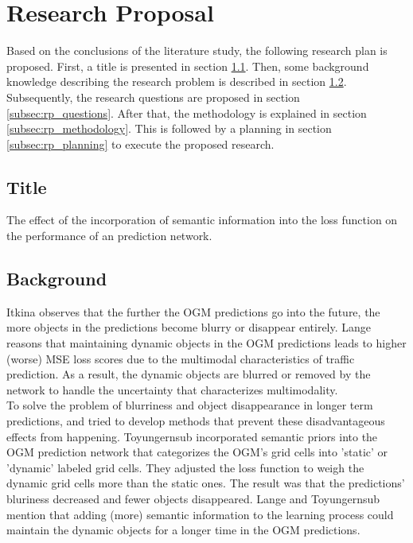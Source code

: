 \section{Research Proposal} \label{sec:res_prop}
Based on the conclusions of the literature study, the following research plan is proposed. First, a title is presented in section \ref{subsec:rp_title}. Then, some background knowledge describing the research problem is described in section \ref{subsec:rp_background}. Subsequently, the research questions are proposed in section \ref{subsec:rp_questions}. After that, the methodology is explained in section \ref{subsec:rp_methodology}. This is followed by a planning in section \ref{subsec:rp_planning} to execute the proposed research. 

\subsection{Title} \label{subsec:rp_title}
The effect of the incorporation of semantic information into the loss function on the performance of an  prediction network.

\subsection{Background} \label{subsec:rp_background}
Itkina \cite{itkina2019dynamic} observes that the further the \gls{OGM} predictions go into the future, the more objects in the predictions become blurry or disappear entirely. Lange \cite{lange2020attention} reasons that maintaining dynamic objects in the \gls{OGM} predictions leads to higher (worse) \gls{MSE} loss scores due to the multimodal characteristics of traffic prediction. As a result, the dynamic objects are blurred or removed by the network to handle the uncertainty that characterizes multimodality. \\

To solve the problem of blurriness and object disappearance in longer term predictions, \cite{toyungyernsub2020double} and \cite{lange2020attention} tried to develop methods that prevent these disadvantageous effects from happening. Toyungernsub \cite{toyungyernsub2020double} incorporated semantic priors into the \gls{OGM} prediction network that categorizes the \gls{OGM}'s grid cells into 'static' or 'dynamic' labeled grid cells. They adjusted the loss function to weigh the dynamic grid cells more than the static ones. The result was that the predictions' bluriness decreased and fewer objects disappeared. Lange \cite{lange2020attention} and Toyungernsub \cite{toyungyernsub2020double} mention that adding (more) semantic information to the learning process could maintain the dynamic objects for a longer time in the \gls{OGM} predictions. \\

